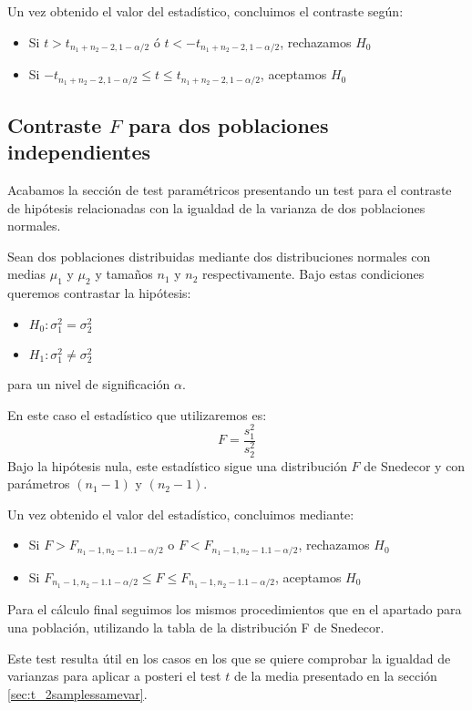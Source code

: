 \documentclass[a4paper,12pt]{article}
\begin{document}
Un vez obtenido el valor del estadístico, concluimos el contraste según:
\begin{itemize}
	\item Si $t > t_{n_1+n_2-2,1-\alpha/2}$ ó $t < -t_{n_1+n_2-2,1-\alpha/2}$, rechazamos $H_0$
	\item Si $-t_{n_1+n_2-2,1-\alpha/2}\leq t\leq t_{n_1+n_2-2,1-\alpha/2}$, aceptamos $H_0$
\end{itemize}

\subsection{Contraste $F$ para dos poblaciones independientes }
\label{sec:F_2samples}
Acabamos la sección de test paramétricos presentando un test para el contraste de hipótesis relacionadas con la igualdad de la varianza de dos poblaciones normales.

    Sean dos poblaciones distribuidas mediante dos distribuciones normales con medias $\mu_1$ y $\mu_2$ y  tamaños $n_1$ y $n_2$ respectivamente.
    Bajo estas condiciones queremos contrastar la hipótesis:
    \begin{itemize}
	\item $H_0:\sigma^2_1=\sigma^2_2$
	\item $H_1:\sigma^2_1\neq \sigma^2_2$
    \end{itemize}
    para un nivel de significación $\alpha$.

    En este caso el estadístico que utilizaremos es: 
    $$F=\frac{s_1^2}{s_2^2}$$
    Bajo la hipótesis nula, este estadístico sigue una distribución $F$ de Snedecor y con parámetros $(n_1 - 1)$ y $(n_2 - 1)$.

    Un vez obtenido el valor del estadístico, concluimos mediante:
    \begin{itemize}
	\item Si $F>F_{n_1-1,n_2-1.1-\alpha/2}$ o $F<F_{n_1-1,n_2-1.1-\alpha/2}$, rechazamos $H_0$
	\item Si $F_{n_1-1,n_2-1.1-\alpha/2}\leq F \leq F_{n_1-1,n_2-1.1-\alpha/2}$, aceptamos $H_0$
    \end{itemize}
    Para el cálculo final seguimos los mismos procedimientos que en el apartado para una población, utilizando la tabla de la distribución F de Snedecor.

    Este test resulta útil en los casos en los que se quiere comprobar la igualdad de varianzas para aplicar a posteri el test $t$  de la media presentado en la sección \ref{sec:t_2samplessamevar}.
\end{document}
